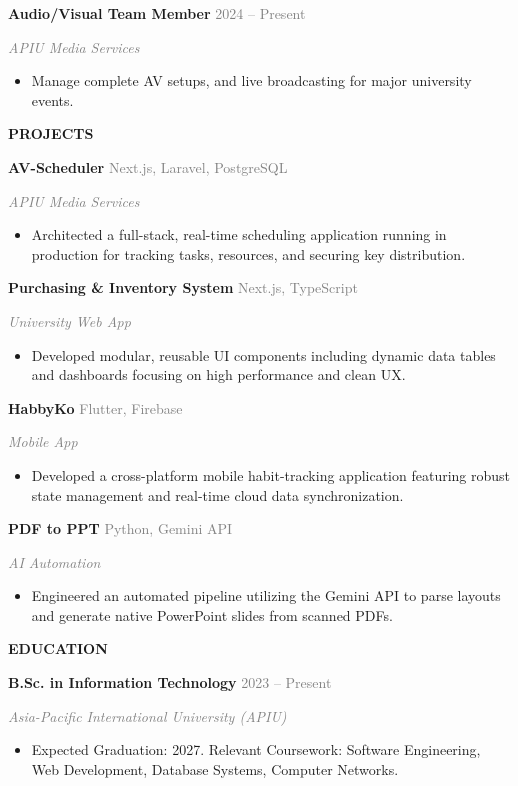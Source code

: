 \documentclass[10pt,a4paper]{article}
\newcommand{\timelineheader}[2]{%
  \vspace{1ex}
  \noindent\hspace{-15pt}\makebox[0pt][c]{\raisebox{-0.15cm}{\tikz\node[circle,fill=mainblue,text=white,inner sep=2pt,minimum size=0.6cm]{\small\faIcon{#1}};}}%
  \hspace{15pt}\textbf{\large\textcolor{mainblue}{\uppercase{#2}}}\par\vspace{0.5ex}%
}
\newcommand{\timelineitemheader}[3]{%
  \vspace{0.8ex}
  \noindent\hspace{-15pt}\makebox[0pt][c]{\raisebox{0.05cm}{\tikz\node[circle,draw=mainblue,thick,fill=white,inner sep=1.5pt]{};}}%
  \hspace{15pt}\textbf{#1} \hfill \textcolor{graytext}{\small #2} \par
  \noindent\textcolor{graytext}{\small\textit{#3}} \par\vspace{0.2ex}%
}
\newcommand{\timelineitemdesc}[1]{%
  \noindent%
  \begin{minipage}{\linewidth}
    \small #1
  \end{minipage}\par\vspace{0.5ex}%
}
\begin{document}
\begin{minipage}[t]{0.66\textwidth}
\begin{tcolorbox}
\timelineitemheader{Audio/Visual Team Member}{2024 -- Present}{APIU Media Services}
\timelineitemdesc{
\begin{itemize}[leftmargin=0.4cm,itemsep=1pt,topsep=0pt]
  \item Manage complete AV setups, and live broadcasting for major university events.
\end{itemize}
}

\timelineheader{code}{Projects}

\timelineitemheader{AV-Scheduler}{Next.js, Laravel, PostgreSQL}{APIU Media Services}
\timelineitemdesc{
\begin{itemize}[leftmargin=0.4cm,itemsep=1pt,topsep=0pt]
  \item Architected a full-stack, real-time scheduling application running in production for tracking tasks, resources, and securing key distribution.
\end{itemize}
}

\timelineitemheader{Purchasing \& Inventory System}{Next.js, TypeScript}{University Web App}
\timelineitemdesc{
\begin{itemize}[leftmargin=0.4cm,itemsep=1pt,topsep=0pt]
  \item Developed modular, reusable UI components including dynamic data tables and dashboards focusing on high performance and clean UX.
\end{itemize}
}

\timelineitemheader{HabbyKo}{Flutter, Firebase}{Mobile App}
\timelineitemdesc{
\begin{itemize}[leftmargin=0.4cm,itemsep=1pt,topsep=0pt]
  \item Developed a cross-platform mobile habit-tracking application featuring robust state management and real-time cloud data synchronization.
\end{itemize}
}

\timelineitemheader{PDF to PPT}{Python, Gemini API}{AI Automation}
\timelineitemdesc{
\begin{itemize}[leftmargin=0.4cm,itemsep=1pt,topsep=0pt]
  \item Engineered an automated pipeline utilizing the Gemini API to parse layouts and generate native PowerPoint slides from scanned PDFs.
\end{itemize}
}

\timelineheader{graduation-cap}{Education}
\timelineitemheader{B.Sc. in Information Technology}{2023 -- Present}{Asia-Pacific International University (APIU)}
\timelineitemdesc{
\begin{itemize}[leftmargin=0.4cm,itemsep=1pt,topsep=0pt]
  \item Expected Graduation: 2027. Relevant Coursework: Software Engineering, Web Development, Database Systems, Computer Networks.
\end{itemize}
}

\end{tcolorbox}
\end{minipage}
\end{document}
